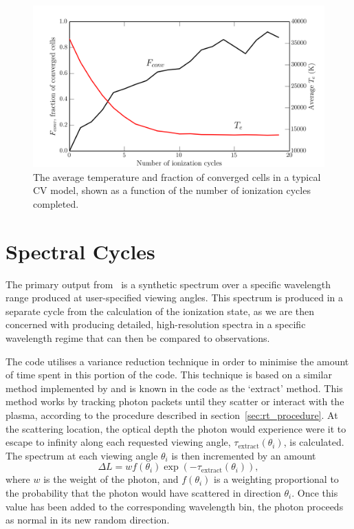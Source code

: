 \begin{figure}
\centering
\includegraphics[width=1.0\textwidth]{figures/03-radtrans/graph_conv.png}
\caption
{
The average temperature and fraction of converged cells in
a typical CV model, shown as a function of the number of ionization cycles
completed. 
} 
\label{fig:conv}
\end{figure}




\section{Spectral Cycles}
\label{sec:spectral_cycles}
The primary output from \py\ is a synthetic spectrum over a specific wavelength
range produced at user-specified viewing angles. This spectrum is produced 
in a separate cycle from the calculation of the ionization state, as we are then concerned
with producing detailed, high-resolution spectra in a specific wavelength regime
that can then be compared to observations.

The code utilises a variance reduction technique in order to minimise the amount of 
time spent in this portion of the code. This technique is based 
on a similar method implemented by \cite{woods1991} and is known in the code
as the `extract' method. This method works by 
tracking photon packets until they scatter or interact with the plasma, according
to the procedure described in section~\ref{sec:rt_procedure}. 
At the scattering location, the optical depth the photon would
experience were it to escape to infinity along each requested viewing angle, 
$\tau_{\mathrm{extract}}(\theta_i)$, is calculated. The spectrum at each 
viewing angle $\theta_i$ is then incremented by an amount
\begin{equation}
\Delta L = w f(\theta_i) \exp(-\tau_{\mathrm{extract}}(\theta_i)),
\end{equation}
where $w$ is the weight of the photon, and $f(\theta_i)$ is a weighting proportional to
the probability that the photon would have scattered in direction $\theta_i$. Once this
value has been added to the corresponding wavelength bin, the photon
proceeds as normal in its new random direction.

